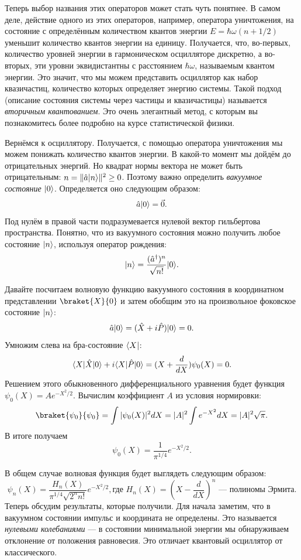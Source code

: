 Теперь выбор названия этих операторов может стать чуть понятнее. В самом деле,
действие одного из этих операторов, например, оператора уничтожения, на
состояние с определённым количеством квантов энергии $E = \hbar\omega(n + 1/2)$
уменьшит количество квантов энергии на единицу. Получается, что, во-первых,
количество уровней энергии в гармоническом осцилляторе дискретно, а во-вторых,
эти уровни эквидистантны с расстоянием $\hbar\omega$, называемым квантом
энергии. Это значит, что мы можем представить осциллятор как набор квазичастиц,
количество которых определяет энергию системы. Такой подход (описание состояния
системы через частицы и квазичастицы) называется \textit{вторичным
  квантованием}. Это очень элегантный метод, с которым вы познакомитесь более
подробно на курсе статистической физики.

Вернёмся к осциллятору. Получается, с помощью оператора уничтожения мы можем
понижать количество квантов энергии. В какой-то момент мы дойдём до
отрицательных энергий. Но квадрат нормы вектора не может быть отрицательным: $n
  = \|\hat{a}\lvert n\rangle\|^2 \geq 0$. Поэтому важно определить \textit{вакуумное
  состояние} $\lvert0\rangle$. Определяется оно следующим образом:
\[
  \hat{a}\lvert0\rangle = \vec 0.
\]
Под нулём в правой части подразумевается нулевой вектор гильбертова
пространства. Понятно, что из вакуумного состояния можно получить любое
состояние $\lvert n\rangle$, используя оператор рождения:
\[
  \lvert n\rangle = \frac{(\hat{a}^{\dagger})^n}{\sqrt{n!}}\lvert0\rangle.
\]

Давайте посчитаем волновую функцию вакуумного состояния в координатном
представлении $\braket{X}{0}$ и затем обобщим это на произвольное фоковское
состояние $\lvert n\rangle$:
\[
  \hat{a}\lvert0\rangle = (\hat{X} + i\hat{P})\lvert0\rangle = 0.
\]
Умножим слева на бра-состояние $\langle X\rvert$:
\[
  \langle X\rvert\hat{X}\lvert0\rangle + i\langle X\rvert\hat{P}\lvert0\rangle = (X + \frac{d}{dX})\psi_0(X) = 0.
\]
Решением этого обыкновенного дифференциального уравнения будет функция
$\psi_0(X) = Ae^{-X^2/2}$. Вычислим коэффициент $A$ из условия нормировки:
\[
  \braket{\psi_0}{\psi_0} = \int |\psi_0(X)|^2 dX = |A|^2\int e^{-X^2}dX = |A|^2\sqrt{\pi}.
\]
В итоге получаем
\[
  \psi_0(X) = \frac{1}{\pi^{1/4}}e^{-X^2/2}.
\]

В общем случае волновая функция будет выглядеть следующим образом:
\[
  \psi_n(X) = \frac{H_n(X)}{\pi^{1/4}\sqrt{2^n n!}}e^{-X^2/2}, \text{где } H_n(X) = (X - \frac{d}{dX})^n \text{ --- полиномы Эрмита}.
\]
Теперь обсудим результаты, которые получили. Для начала заметим, что в
вакуумном состоянии импульс и координата не определены. Это называется
\textit{нулевыми колебаниями} --- в состоянии минимальной энергии мы
обнаруживаем отклонение от положения равновесия. Это отличает квантовый
осциллятор от классического.

